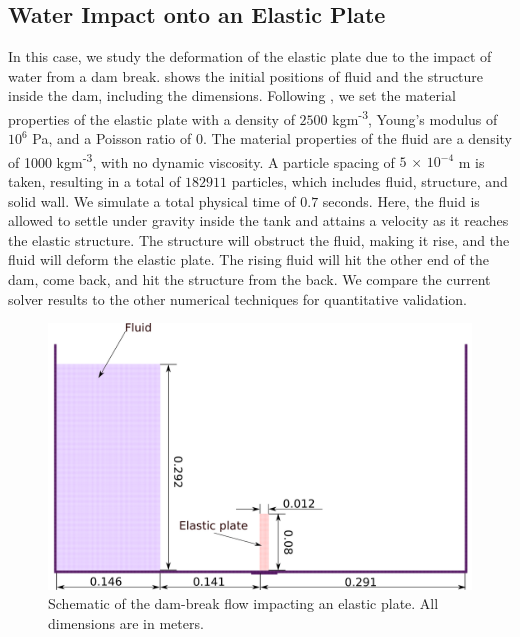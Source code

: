 \subsection{Water Impact onto an Elastic Plate}
\label{sec:water-impact-forefront}
In this case, we study the deformation of the elastic
plate due to the impact of water from a dam break.
 shows the initial positions
of fluid and the structure inside the dam, including the dimensions. Following
\textcite{sun2019fully}, we set the material properties of the elastic plate with a
density of $2500$ kgm\textsuperscript{-3}, Young's modulus of $10^6$ Pa, and a
Poisson ratio of $0$. The material properties of the fluid are a density of 1000
kgm\textsuperscript{-3}, with no dynamic viscosity. A particle spacing of $5$
$\times$ $10^{-4}$ m is taken, resulting in a total of $182911$ particles, which
includes fluid, structure, and solid wall. We simulate a total physical time of
$0.7$ seconds. Here, the fluid is allowed to settle under gravity inside the
tank and attains a velocity as it reaches the elastic structure. The structure
will obstruct the fluid, making it rise, and the fluid will deform the elastic
plate. The rising fluid will hit the other end of the dam, come back, and hit
the structure from the back. We compare the current solver results to the other
numerical techniques for quantitative validation.
\begin{figure}
  \centering
  \includegraphics[scale=0.4]{images/fsi/images/sun_2019_dam_breaking_flow_impacting_an_elastic_plate/schematic}
  \caption{Schematic of the dam-break flow impacting an elastic plate. All dimensions are in meters.}
\label{fig:dam-break-flow-impact-plate-initial-setup}
\end{figure}

